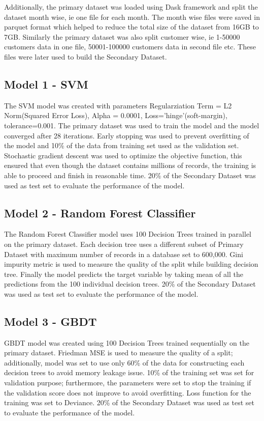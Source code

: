 \documentclass[twoside,11pt,a4paper]{article}
\begin{document}
Additionally, the primary dataset was loaded using Dask framework and split the dataset month wise, ie one file for each month. The month wise files were saved in parquet format which helped to reduce the total size of the dataset from 16GB to 7GB. Similarly the primary dataset was also split customer wise, ie 1-50000 customers data in one file, 50001-100000 customers data in second file etc. These files were later used to build the Secondary Dataset.

\subsection{Model 1 - \acf{SVM}}
The \acs{SVM} model was created with parameters Regularziation Term = L2 Norm(Squared Error Loss), Alpha = 0.0001, Loss='hinge'(soft-margin), tolerance=0.001. The primary dataset was used to train the model and the model converged after 28 iterations. Early stopping was used to prevent overfitting of the model and 10\% of the data from training set used as the validation set. Stochastic gradient descent was used to optimize the objective function, this ensured that even though the dataset contains millions of records, the training is able to proceed and finish in reasonable time.  20\% of the Secondary Dataset was used as test set to evaluate the performance of the model.
\subsection{Model 2 - Random Forest Classifier}
The Random Forest Classifier model uses 100 Decision Trees trained in parallel on the primary dataset. Each decision tree uses a different subset of Primary Dataset with maximum number of records in a database set to 600,000. Gini impurity metric is used to measure the quality of the split while building decision tree. Finally the model predicts the target variable by taking mean of all the predictions from the 100 individual decision trees. 20\% of the Secondary Dataset was used as test set to evaluate the performance of the model.
\subsection{Model 3 - \acf{GBDT}}
\acs{GBDT} model was created using 100 Decision Trees trained sequentially on the primary dataset. Friedman \acf{MSE} is used to measure the quality of a split; additionally, model was set to use only 60\% of the data for constructing each decision trees to avoid memory leakage issue. 10\% of the training set was set for validation purpose; furthermore, the parameters were set to stop the training if the validation score does not improve to avoid overfitting. Loss function for the training was set to Deviance. 20\% of the Secondary Dataset was used as test set to evaluate the performance of the model.
\end{document}
